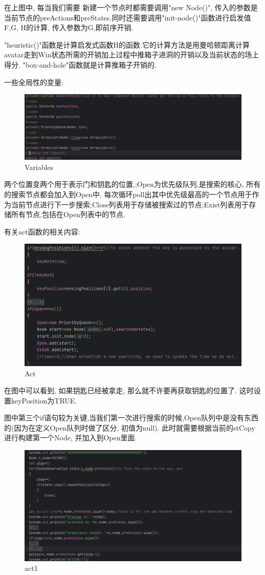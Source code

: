 \documentclass{article}
\begin{document}
\newpage

在上图中, 每当我们需要 新建一个节点时都需要调用"new Node()", 传入的参数是当前节点的preActions和preStates.同时还需要调用"init-node()"函数进行启发值F,G, H的计算, 传入参数为G,即前序开销.

"heuristic()"函数是计算启发式函数H的函数.它的计算方法是用曼哈顿距离计算avatar走到Win状态所需的开销加上过程中推箱子进洞的开销以及当前状态的场上得分. "box-and-hole"函数就是计算推箱子开销的.

一些全局性的变量:
\begin{figure}[h]
\centering
\includegraphics[width=0.5\linewidth]{Node2}
\caption{Variables}
\end{figure}
两个位置变两个用于表示门和钥匙的位置,;Open为优先级队列,是搜索的核心, 所有的搜索节点都会加入到Open中, 每次循环poll出其中优先级最高的一个节点用于作为当前节点进行下一步搜索;Close列表用于存储被搜索过的节点;Exist列表用于存储所有节点,包括在Open列表中的节点.

 有关act函数的相关内容:

\begin{figure}[h]
\centering
\includegraphics[width=0.5\linewidth]{Astaract}
\caption{Act}
\end{figure}

在图中可以看到, 如果钥匙已经被拿走, 那么就不许要再获取钥匙的位置了. 这时设置keyPosition为TRUE. 

图中第三个if语句较为关键,当我们第一次进行搜索的时候,Open队列中是没有东西的(因为在定义Open队列时做了区分, 初值为null). 此时就需要根据当前的stCopy进行构建第一个Node, 并加入到Open里面.

\begin{figure}[h]
\centering
\includegraphics[width=0.5\linewidth]{act1}
\caption{act1}
\end{figure}
\end{document}
